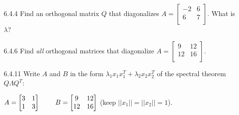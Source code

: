 \documentclass[10pt,twoside,reqno]{article}
\begin{document}
\begin{enumerate}
\item[6.4.4] Find an orthogonal matrix $Q$ that diagonalizes $A=
\begin{bmatrix}
-2&6\\
6&7\\
\end{bmatrix}$. What is $\lambda$?
\\ \vspace{2mm}


\vspace{3mm}
\item[6.4.6] Find \textit{all} orthogonal matrices that diagonalize $A = 
\begin{bmatrix}
9&12\\
12&16\\
\end{bmatrix}$. \\ \vspace{2mm}


\vspace{3mm}
\item[6.4.11] Write $A$ and $B$ in the form $\lambda_1x_1x_1^T+\lambda_2x_2x_2^T$ of the spectral theorem $Q \Lambda Q^T$: \\
\begin{center}
$
A=
\begin{bmatrix}
3&1\\
1&3\\
\end{bmatrix}
\hspace{8mm}
B=
\begin{bmatrix}
9&12\\
12&16\\
\end{bmatrix}
$
\hspace{6mm} (keep $||x_1||=||x_2||=1$). \\
\end{center}
\vspace{2mm}



\end{enumerate}
\end{document}
